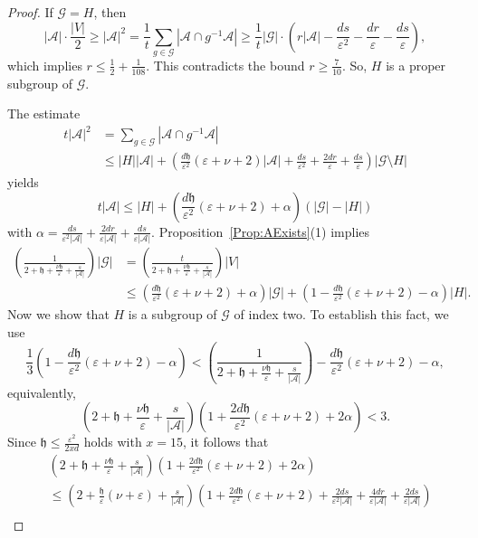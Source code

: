 \documentclass[10pt]{article}
\theoremstyle{definition}
\newcommand{\mo}{{-1}}
\newcommand{\calG}{\ensuremath{\mathcal{G}}}
\newcommand{\scrA}{\ensuremath{\mathscr{A}}}
\newcommand{\tth}{\ensuremath{\mathfrak{h}}}
\begin{document}
\begin{proof}
If $\calG = H$, then 
$$|\scrA| \cdot \frac{|V|}{2} 
\geq |\scrA|^2 = \frac 1t \sum_{g\in \calG} |\scrA\cap g^\mo \scrA|
\geq \frac 1t |\calG| \cdot 
\left(r|\scrA|  - \frac{ds}{\varepsilon^2} 
- \frac{dr}{\varepsilon}
- \frac{ds}{\varepsilon}
\right),$$
which implies $r \leq \frac 12 + \frac 1{108}$. This contradicts the bound $r \geq \frac 7 {10}$. So, $H$ is a proper subgroup of $\calG$. 

The estimate 
\begin{align*}
t |\scrA|^2 
&= \sum_{g\in \calG} |\scrA\cap g^\mo \scrA| \\
&\leq |H| |\scrA| + \left(
\frac{d\tth}{\varepsilon^2}(\varepsilon + \nu+ 2)|\scrA|
+ \frac{ds}{\varepsilon^2} + \frac{2dr}\varepsilon + \frac{ds}{\varepsilon}
\right)
|\calG\setminus H|
\end{align*}
yields
$$t |\scrA|  
\leq |H| + 
\left(
\frac{d\tth}{\varepsilon^2}(\varepsilon + \nu+ 2)
+ 
\alpha
\right)
(|\calG| - |H|)$$
with $\alpha  = \frac{ds}{\varepsilon^2|\scrA|} + \frac{2dr}{\varepsilon |\scrA|} + \frac{ds}{\varepsilon |\scrA|}$. 
Proposition~\ref{Prop:AExists}(1) implies
\begin{align*}
\left(\frac{1}{2+ \tth + \frac{\nu\tth}{\varepsilon} +\frac{s}{|\scrA|}}\right) |\calG| 
& = \left(\frac{t}{2+ \tth + \frac{\nu\tth}{\varepsilon} + \frac{s}{|\scrA|}}\right) |V| \\
&\leq 
 \left(
\frac{d\tth}{\varepsilon^2}(\varepsilon + \nu+ 2)
+ 
\alpha
\right)|\calG| 
+  \left(1 - \frac{d\tth}{\varepsilon^2}(\varepsilon + \nu+ 2)
- \alpha
\right) |H|.
\end{align*}
Now we show that $H$ is a subgroup of $\calG$ of index two. To establish this fact, we use 
\[\frac 13 \left(1 - \frac{d\tth}{\varepsilon^2}(\varepsilon + \nu+ 2) - \alpha \right)
< 
\left(\frac{1}{2+ \tth + \frac{\nu\tth}{\varepsilon}+ \frac{s}{|\scrA|}}\right) - \frac{d\tth}{\varepsilon^2}(\varepsilon + \nu+ 2) - \alpha,\]
equivalently, 
$$\left(2 + \tth + \frac{\nu\tth}{\varepsilon} +\frac{s}{|\scrA|}\right) \left( 1 + \frac{2d\tth}{\varepsilon^2}(\varepsilon + \nu+ 2) + 2\alpha \right) < 3.$$
Since $\tth\leq  \frac{\varepsilon^{2}}{2x d}$ holds with $x= 15$, it follows that  
\begin{align*}
& \left(2 + \tth + \frac{\nu\tth}{\varepsilon} + \frac{s}{|\scrA|}\right) \left( 1 + \frac{2d\tth}{\varepsilon^2}(\varepsilon + \nu+ 2) +
2\alpha \right)\\
& 
\leq 
\left(2 + \frac{\tth}{\varepsilon} (\nu + \varepsilon) + \frac{s}{|\scrA|}\right) \left( 1 + \frac{2d\tth}{\varepsilon^2}(\varepsilon + \nu+ 2) + \frac{2ds}{\varepsilon^2|\scrA|} + \frac{4dr}{\varepsilon |\scrA| } + \frac{2ds}{\varepsilon |\scrA|} \right)\\

\end{align*}
\end{proof}
\end{document}
